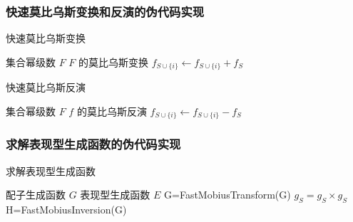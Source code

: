 \documentclass[12pt]{article} %
\begin{document}
\subsubsection*{快速莫比乌斯变换和反演的伪代码实现}

\begin{algorithm}
    \caption{快速莫比乌斯变换}
    \begin{algorithmic}[1]
        \Require 集合幂级数 $F$
        \Ensure $F$ 的莫比乌斯变换
                    \State $f_{S \cup \{i\}} \gets f_{S \cup \{i\}} + f_{S}$
                \EndFor
            \EndFor
            \State {}
        \EndFunction
    \end{algorithmic}
\end{algorithm}

\begin{algorithm}
    \caption{快速莫比乌斯反演}
    \begin{algorithmic}[1]
        \Require 集合幂级数 $F$
        \Ensure $f$ 的莫比乌斯反演
                    \State $f_{S \cup \{i\}} \gets f_{S \cup \{i\}} - f_{S}$
                \EndFor
            \EndFor
            \State {}
        \EndFunction
    \end{algorithmic}
\end{algorithm}

\newpage

\subsubsection*{求解表现型生成函数的伪代码实现}

\begin{algorithm}
    \caption{求解表现型生成函数}
    \begin{algorithmic}[1]
        \Require 配子生成函数 $G$
        \Ensure 表现型生成函数 $E$
			\State G=FastMobiusTransform(G)
                \State $g_S=g_S \times g_S$
            \EndFor
			\State H=FastMobiusInversion(G)
            \State {}
        \EndFunction
    \end{algorithmic}
\end{algorithm}
\end{document}
